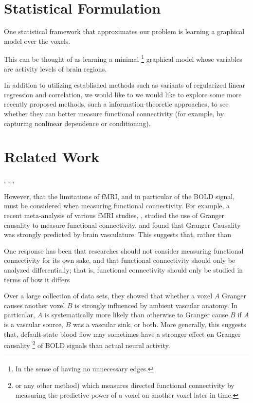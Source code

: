 \documentclass[11pt]{article}
\begin{document}
\section{Statistical Formulation}
One statistical framework that approximates our problem is learning a graphical
model over the voxels.

This can be thought of as learning a minimal
\footnote{In the sense of having no unnecessary edges.}
graphical model whose variables are activity levels of brain regions.

In addition to utilizing established methods such as variants of regularized
linear regression and correlation, we would like to we would like to explore
some more recently proposed methods, such a information-theoretic approaches, to
see whether they can better measure functional connectivity (for example, by
capturing nonlinear dependence or conditioning).

\section{Related Work}
\cite{Grosenick13GraphNet}, \cite{Li09FDRinPCAlgo}, \cite{Garg11FARM},

However, that the limitations of fMRI, and in particular of the BOLD signal,
must be considered when measuring functional connectivity. For example, a
recent meta-analysis of various fMRI studies, \cite{webb13grangerVascular},
studied the use of Granger causality to measure functional connectivity, and
found that Granger Causality was strongly predicted by brain vasculature. This
suggests that, rather than

One response has been that researches should not consider measuring functional
connectivity for its own sake, and that functional connectivity should only be
analyzed differentially; that is, functional connectivity should only be
studied in terms of how it differs

Over a large collection of data sets, they showed that whether a voxel $A$
Granger causes another voxel $B$ is strongly influenced by ambient vascular
anatomy. In particular, $A$ is systematically more likely than otherwise to
Granger cause $B$ if $A$ is a vascular source, $B$ was a vascular sink, or
both. More generally, this suggests that, default-state blood flow may
sometimes have a stronger effect on Granger causality \footnote{or any other
method) which measures directed functional connectivity by measuring the
predictive power of a voxel on another voxel later in time.} of BOLD signals
than actual neural activity.
\end{document}
